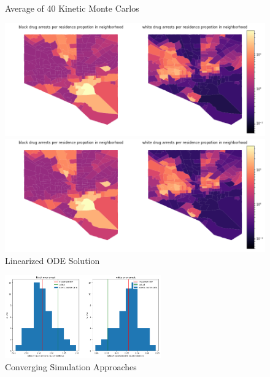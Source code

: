 \documentclass[10pt]{article}
\begin{document}
 \begin{figure}[!htb]
 \begin{minipage}{0.5\textwidth}
     \caption{Average of 40 Kinetic Monte Carlos}
     \centering
     \includegraphics[width=\textwidth]{km.png}
   \end{minipage}\hfill
   \begin{minipage}{0.5\textwidth}
     \caption{Linearized ODE Solution}
     \centering
     \includegraphics[width=\textwidth]{rk.png}
   \end{minipage}\hfill
 \end{figure}
 
    \begin{figure}[!htb]
    \begin{minipage}{\textwidth}
     \caption{Converging Simulation Approaches}
     \centering
     \includegraphics[width=0.6\textwidth]{kmandrk.png}
   \end{minipage}\hfill
 \end{figure}
 
\end{document}
